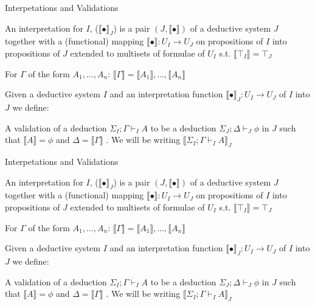 \documentclass{beamer}
\begin{document}
\begin{frame}{Interpetations and Validations}
  
  \begin{outline}
  \1An interpretation for $I$, ($\llbracket\bullet \rrbracket_J$) is a pair $(J,\llbracket\bullet\rrbracket)$ of a deductive system $J$ together with a (functional) mapping $\llbracket \bullet \rrbracket: U_I\rightarrow U_J$ on propositions of $I$ into propositions of $J$ extended to multisets of formulae of $U_I$ s.t.
  \2 $\llbracket\top_I \rrbracket = \top_J$
  
  \2 For $\Gamma$ of the form $A_1,\ldots, A_n$: $\llbracket\Gamma \rrbracket=\llbracket A_1 \rrbracket,\ldots, \llbracket A_n\rrbracket$
  
  \1 Given a deductive system $I$ and an interpretation function $\llbracket\bullet\rrbracket_J:U_I\rightarrow U_J$ of $I$ into $J$ we define:
  
  \2 A validation of a deduction $\Sigma_I;\Gamma\vdash_I A$ to be a deduction $\Sigma_J;\Delta\vdash_{J} \phi$ in $J$ such that $\llbracket A \rrbracket=\phi$ and $\Delta=\llbracket \Gamma \rrbracket $ . We will be writing $ \llbracket \Sigma_I;\Gamma\vdash_I A\rrbracket_J$
  \end{outline}
\end{frame}
\begin{frame}{Interpetations and Validations}
  
  \begin{outline}
  \1An interpretation for $I$, ($\llbracket\bullet \rrbracket_J$) is a pair $(J,\llbracket\bullet\rrbracket)$ of a deductive system $J$ together with a (functional) mapping $\llbracket \bullet \rrbracket: U_I\rightarrow U_J$ on propositions of $I$ into propositions of $J$ extended to multisets of formulae of $U_I$ s.t.
  \2 $\llbracket\top_I \rrbracket = \top_J$
  
  \2 For $\Gamma$ of the form $A_1,\ldots, A_n$: $\llbracket\Gamma \rrbracket=\llbracket A_1 \rrbracket,\ldots, \llbracket A_n\rrbracket$
  
  \1 Given a deductive system $I$ and an interpretation function $\llbracket\bullet\rrbracket_J:U_I\rightarrow U_J$ of $I$ into $J$ we define:
  
  \2 A validation of a deduction $\Sigma_I;\Gamma\vdash_I A$ to be a deduction $\Sigma_J;\Delta\vdash_{J} \phi$ in $J$ such that $\llbracket A \rrbracket=\phi$ and $\Delta=\llbracket \Gamma \rrbracket $ . We will be writing $ \llbracket \Sigma_I;\Gamma\vdash_I A\rrbracket_J$
  \end{outline}
\end{frame}
\end{document}
